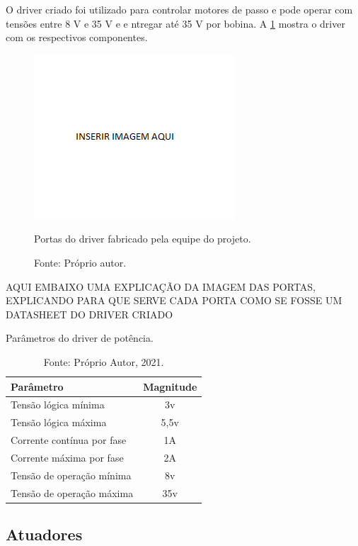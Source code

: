 O driver criado foi utilizado para controlar motores de passo e pode operar com tensões entre 8 V e 35 V e e
ntregar até 35 V por bobina. A \ref{figdriverportas} mostra o driver com os respectivos componentes.

\begin{figure}[!htb]
\centering
\includegraphics[scale = 0.2]{figuras/3-14}
\caption{Portas do driver fabricado pela equipe do projeto.}
\caption*{Fonte: Próprio autor.}
\label{figdriverportas}
\end{figure}
    
AQUI EMBAIXO UMA EXPLICAÇÃO DA IMAGEM DAS PORTAS, EXPLICANDO PARA QUE SERVE CADA PORTA COMO SE 
FOSSE UM DATASHEET DO DRIVER CRIADO

\begin{table}
    \centering
    \caption{Parâmetros do driver de potência.}
    \begin{tabular}{lc}
        \hline
        \textbf{Parâmetro} & \textbf{Magnitude}\\
        \hline
        Tensão lógica mínima & 3v\\
        Tensão lógica máxima & 5,5v\\
        Corrente contínua por fase & 1A\\
        Corrente máxima por fase & 2A\\
        Tensão de operação mínima & 8v\\
        Tensão de operação máxima & 35v\\ 
        \hline       
    \end{tabular}
    \caption*{Fonte: Próprio Autor, 2021.}
    \label{tab:pdriver}
\end{table}

\subsection{Atuadores}

